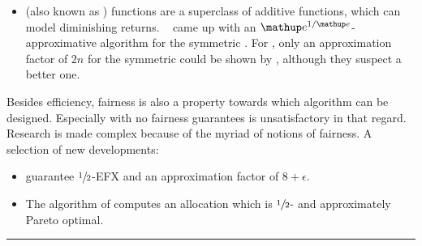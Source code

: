\begin{itemize}[leftmargin=*, nosep]
	\item
	\CASC{} (also known as \SPLC) functions are a superclass of additive functions, which can model diminishing returns.
	~\cite{fair_division_of_indiv_goods_for_a_class_of_concave_valuations} came up with an \(\euler^{1/\euler}\)-approximative algorithm for the symmetric \CASC{} \NSW.
	For \SMatch{}, only an approximation factor of \(2n\) for the symmetric \CASC{} \NSW{} could be shown by \citeauthor{APNSWuSVþUM}, although they suspect a better one.
\end{itemize}

Besides efficiency, fairness is also a property towards which algorithm can be designed.
Especially \RepReMatch{} with no fairness guarantees is unsatisfactory in that regard.
Research is made complex because of the myriad of notions of fairness.
A selection of new developments:
\begin{itemize}[leftmargin=*, nosep]
	\item
	 guarantee \(\sfrac{1}{2}\)-EFX and an approximation factor of \(8 + \epsilon\).

	\item
	The algorithm of \citeauthor{fair_division_of_indiv_goods_for_a_class_of_concave_valuations} computes an allocation which is \(\sfrac{1}{2}\)-\EFone{} and approximately Pareto optimal.
\end{itemize}

\hrule

